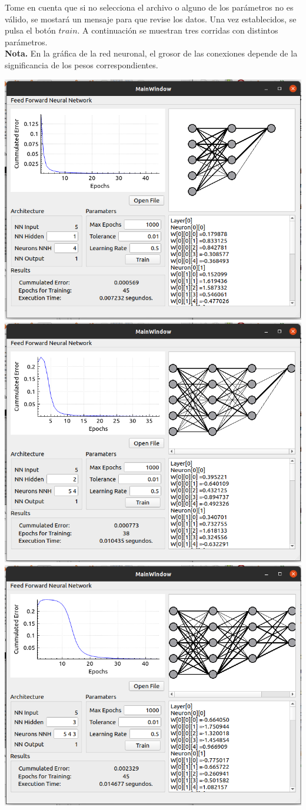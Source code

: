 \documentclass[12pt,letterpaper]{article}
\theoremstyle{definition}
\theoremstyle{definition}
\theoremstyle{definition}
\theoremstyle{definition}
\theoremstyle{definition}
\theoremstyle{definition}
\begin{document}
Tome en cuenta que si no selecciona el archivo o alguno de los parámetros no es válido, se mostará un mensaje para que revise los datos. Una vez establecidos, se pulsa el botón $ train $. A continuación se muestran tres corridas con distintos parámetros.\\
\textbf{Nota.} En la gráfica de la red neuronal, el grosor de las conexiones depende de la significancia de los pesos correspondientes.
\begin{center}
	\includegraphics[width=0.7\linewidth]{1}
	\\	
	\includegraphics[width=0.7\linewidth]{2}
	\\
	\includegraphics[width=0.7\linewidth]{3}
\end{center}
\end{document}
